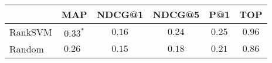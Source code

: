 \begin{tabular}{@{}lccccc@{}}
  \toprule
    & MAP & NDCG@1 & NDCG@5 & P@1 & TOP \\ \midrule
RankSVM & $0.33^{*}$ & $0.16$ & $0.24$ & $0.25$ & $0.96$\\ 
Random & $0.26\:\:$ & $0.15$ & $0.18$ & $0.21$ & $0.86$ \\
\bottomrule
\end{tabular}
